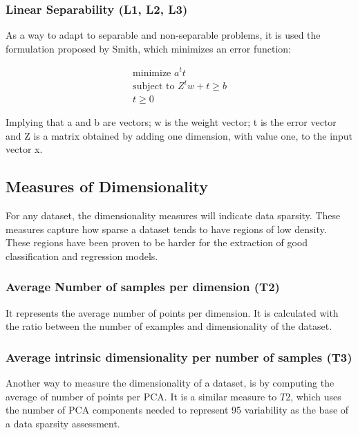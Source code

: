 \subsubsection{Linear Separability (L1, L2, L3)}

As a way to adapt to separable and non-separable problems, it is used the 
formulation proposed by Smith\cite{FWSmith}, which minimizes an error function:

\begin{align*} 
 \text{minimize } a^{t}t \\
 \text{subject to } Z^{t}w + t \geq b \\
 t \geq 0 
\end{align*}

Implying that a and b are vectors; w is the weight vector; t is the error 
vector and Z is a matrix obtained by adding one dimension, with value one, to 
the input vector x.

\subsection{Measures of Dimensionality}\label{sec:dimesionality}

For any dataset, the dimensionality measures will indicate data sparsity.
These measures capture how sparse a dataset tends to have regions of low 
density. These regions have been proven to be harder for the extraction of 
good classification and regression models.

\subsubsection{Average Number of samples per dimension (T2)}

It represents the average number of points per dimension. It is calculated with 
the ratio between the number of examples and dimensionality of the dataset.

\subsubsection{Average intrinsic dimensionality per number of samples (T3)}

Another way to measure the dimensionality of a dataset, is by computing the 
average of number of points per PCA. It is a similar measure to $T2$, which
uses the number of PCA components needed to represent 95 variability as
the base of a data sparsity assessment.

